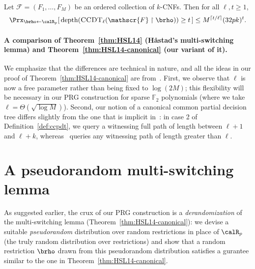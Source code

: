 \documentclass{toc}
\theoremstyle{plain}
\newcommand{\uhr}{\upharpoonright}
\newcommand{\CCDT}{\textsc{CCDT}}
\newcommand{\depth}{\mathrm{depth}}
\renewcommand{\F}{\mathds{F}}
\begin{document}
\begin{theorem}
\label{thm:HSL14-canonical}
Let $\mathscr{F} = (F_1,\ldots,F_M)$ be an ordered collection of $k$-CNFs. Then for all $\ell, t \ge 1$, 
\[ \Prx_{\brho\leftarrow\calR_p}[\, \depth(\CCDT_{\ell}(\mathscr{F}\uhr\brho)) \ge t\,] \le M^{\lceil t/\ell \rceil}(32pk)^t.  \] 
\end{theorem}


\vspace{-8pt} 
\paragraph{A comparison of Theorem~\ref{thm:HSL14} (H{\aa}stad's multi-switching lemma) and Theorem~\ref{thm:HSL14-canonical} (our variant of it).}  We emphasize that the differences are technical in nature, and all the ideas in our proof of Theorem~\ref{thm:HSL14-canonical} are from~\cite{Has14}. First, we observe that $\ell$ is now a free parameter rather than being fixed to $\log(2M)$; this flexibility will be necessary in our PRG construction for sparse $\F_2$ polynomials (where we take $\ell = \Theta(\sqrt{\log M})$).  Second, our notion of a canonical common partial decision tree differs slightly from the one that is implicit in~\cite{Has14}: in case 2 of Definition~\ref{def:ccpdt}, we query a witnessing full path of length between $\ell+1$ and $\ell+k$, whereas~\cite{Has14} queries any witnessing path of length greater than $\ell$.






\section{A pseudorandom multi-switching lemma} \label{sec:derand-H14}

As suggested earlier, the crux of our PRG construction is a \emph{derandomization} of the multi-switching lemma (Theorem~\ref{thm:HSL14-canonical}): we devise a suitable \emph{pseudorandom} distribution over random restrictions in place of $\calR_p$ (the truly random distribution over restrictions) and show that a random restriction $\brho$ drawn from this pseudorandom distribution satisfies a
%
gurantee similar to the one in %
Theorem~\ref{thm:HSL14-canonical}.
\end{document}
